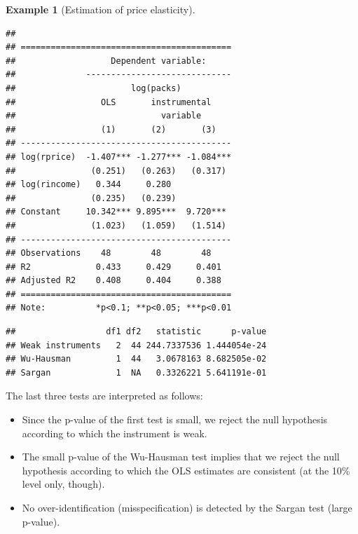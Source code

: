 \documentclass[
  12pt,
]{book}
\newenvironment{Shaded}{\begin{snugshade}}{\end{snugshade}}
\newcommand{\AttributeTok}[1]{\textcolor[rgb]{0.77,0.63,0.00}{#1}}
\newcommand{\ConstantTok}[1]{\textcolor[rgb]{0.00,0.00,0.00}{#1}}
\newcommand{\FunctionTok}[1]{\textcolor[rgb]{0.00,0.00,0.00}{#1}}
\newcommand{\NormalTok}[1]{#1}
\newcommand{\SpecialCharTok}[1]{\textcolor[rgb]{0.00,0.00,0.00}{#1}}
\providecommand{\tightlist}{%
  \setlength{\itemsep}{0pt}\setlength{\parskip}{0pt}}
\theoremstyle{definition}
\theoremstyle{definition}
\newtheorem{example}{Example}[chapter]
\theoremstyle{definition}
\theoremstyle{definition}
\theoremstyle{remark}
\begin{document}
\begin{example}[Estimation of price elasticity]
\begin{verbatim}
## 
## ==========================================
##                   Dependent variable:     
##              -----------------------------
##                       log(packs)          
##                 OLS       instrumental    
##                             variable      
##                 (1)       (2)       (3)   
## ------------------------------------------
## log(rprice)  -1.407*** -1.277*** -1.084***
##               (0.251)   (0.263)   (0.317) 
## log(rincome)   0.344     0.280            
##               (0.235)   (0.239)           
## Constant     10.342*** 9.895***  9.720*** 
##               (1.023)   (1.059)   (1.514) 
## ------------------------------------------
## Observations    48        48        48    
## R2             0.433     0.429     0.401  
## Adjusted R2    0.408     0.404     0.388  
## ==========================================
## Note:          *p<0.1; **p<0.05; ***p<0.01
\end{verbatim}

\begin{Shaded}
\end{Shaded}

\begin{verbatim}
##                  df1 df2   statistic      p-value
## Weak instruments   2  44 244.7337536 1.444054e-24
## Wu-Hausman         1  44   3.0678163 8.682505e-02
## Sargan             1  NA   0.3326221 5.641191e-01
\end{verbatim}

The last three tests are interpreted as follows:

\begin{itemize}
\tightlist
\item
  Since the p-value of the first test is small, we reject the null hypothesis according to which the instrument is weak.
\item
  The small p-value of the Wu-Hausman test implies that we reject the null hypothesis according to which the OLS estimates are consistent (at the 10\% level only, though).
\item
  No over-identification (misspecification) is detected by the Sargan test (large p-value).
\end{itemize}

\end{example}
\end{document}
